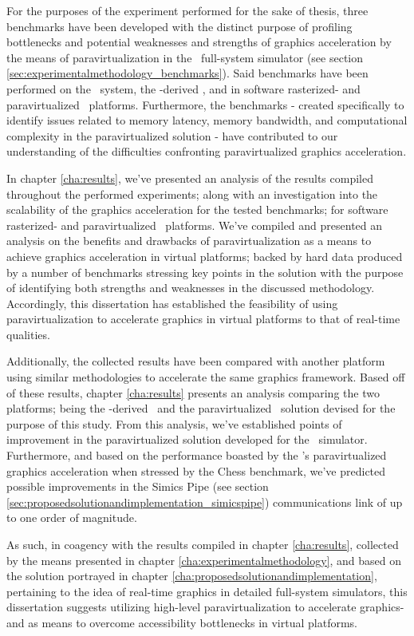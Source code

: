For the purposes of the experiment performed for the sake of thesis, three benchmarks have been developed with the distinct purpose of profiling bottlenecks and potential weaknesses and strengths of graphics acceleration by the means of paravirtualization in the \dvttermsimics\ full-system simulator (see section \ref{sec:experimentalmethodology_benchmarks}).
Said benchmarks have been performed on the \dvttermhost\ system, the \dvttermqemu -derived \dvttermandroidemulator , and in software rasterized- and paravirtualized \dvttermsimics\ platforms.
Furthermore, the benchmarks - created specifically to identify issues related to memory latency, memory bandwidth, and computational complexity in the paravirtualized solution - have contributed to our understanding of the difficulties confronting paravirtualized graphics acceleration.

In chapter \ref{cha:results}, we've presented an analysis of the results compiled throughout the performed experiments; along with an investigation into the scalability of the graphics acceleration for the tested benchmarks; for software rasterized- and paravirtualized \dvttermsimics\ platforms.
We've compiled and presented an analysis on the benefits and drawbacks of paravirtualization as a means to achieve graphics acceleration in virtual platforms; backed by hard data produced by a number of benchmarks stressing key points in the solution with the purpose of identifying both strengths and weaknesses in the discussed methodology.
Accordingly, this dissertation has established the feasibility of using paravirtualization to accelerate graphics in virtual platforms to that of real-time qualities.

Additionally, the collected results have been compared with another platform using similar methodologies to accelerate the same graphics framework.
Based off of these results, chapter \ref{cha:results} presents an analysis comparing the two platforms; being the \dvttermqemu -derived \dvttermandroidemulator\ and the paravirtualized \dvttermsimics\ solution devised for the purpose of this study.
From this analysis, we've established points of improvement in the paravirtualized solution developed for the \dvttermsimics\ simulator.
Furthermore, and based on the performance boasted by the \dvttermandroidemulator 's paravirtualized graphics acceleration when stressed by the Chess benchmark, we've predicted possible improvements in the Simics Pipe (see section \ref{sec:proposedsolutionandimplementation_simicspipe}) communications link of up to one order of magnitude.

As such, in coagency with the results compiled in chapter \ref{cha:results}, collected by the means presented in chapter \ref{cha:experimentalmethodology}, and based on the solution portrayed in chapter \ref{cha:proposedsolutionandimplementation}, pertaining to the idea of real-time graphics in detailed full-system simulators, this dissertation suggests utilizing high-level paravirtualization to accelerate graphics- and as means to overcome accessibility bottlenecks in virtual platforms.
